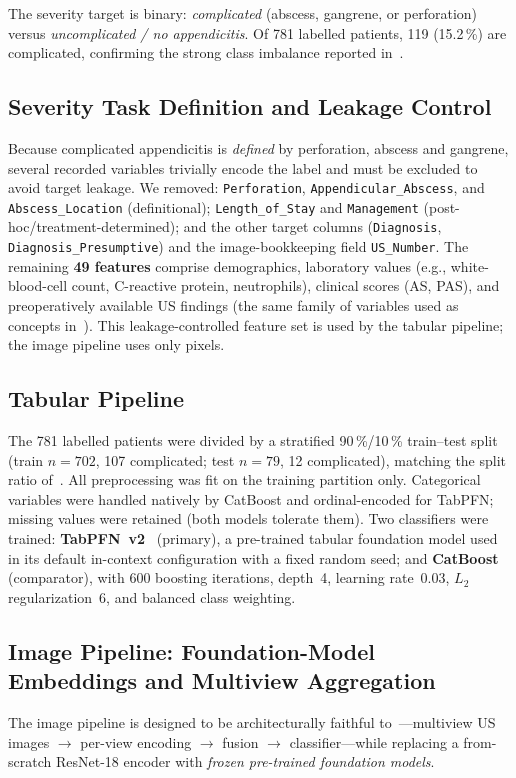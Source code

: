\documentclass[journal]{IEEEtran}
\begin{document}
The severity target is binary: \emph{complicated} (abscess, gangrene, or perforation)
versus \emph{uncomplicated / no appendicitis}. Of 781 labelled patients, 119
(15.2\,\%) are complicated, confirming the strong class imbalance reported
in~\cite{marcinkevics2024interpretable}.

\subsection{Severity Task Definition and Leakage Control}
Because complicated appendicitis is \emph{defined} by perforation, abscess and
gangrene, several recorded variables trivially encode the label and must be excluded to
avoid target leakage. We removed: \texttt{Perforation}, \texttt{Appendicular\_Abscess},
and \texttt{Abscess\_Location} (definitional); \texttt{Length\_of\_Stay} and
\texttt{Management} (post-hoc/treatment-determined); and the other target columns
(\texttt{Diagnosis}, \texttt{Diagnosis\_Presumptive}) and the image-bookkeeping field
\texttt{US\_Number}. The remaining \textbf{49 features} comprise demographics,
laboratory values (e.g., white-blood-cell count, C-reactive protein, neutrophils),
clinical scores (AS, PAS), and preoperatively available US findings (the same family of
variables used as concepts in~\cite{marcinkevics2024interpretable}). This
leakage-controlled feature set is used by the tabular pipeline; the image pipeline uses
only pixels.

\subsection{Tabular Pipeline}
The 781 labelled patients were divided by a stratified 90\,\%/10\,\% train--test split
(train $n=702$, 107 complicated; test $n=79$, 12 complicated), matching the split ratio
of~\cite{marcinkevics2024interpretable}. All preprocessing was fit on the training
partition only. Categorical variables were handled natively by CatBoost and
ordinal-encoded for TabPFN; missing values were retained (both models tolerate them).
Two classifiers were trained: \textbf{TabPFN~v2}~\cite{hollmann2025accurate} (primary),
a pre-trained tabular foundation model used in its default in-context configuration with
a fixed random seed; and \textbf{CatBoost}~\cite{prokhorenkova2018catboost}
(comparator), with 600 boosting iterations, depth~4, learning rate~0.03, $L_2$
regularization~6, and balanced class weighting.

\subsection{Image Pipeline: Foundation-Model Embeddings and Multiview Aggregation}
The image pipeline is designed to be architecturally faithful
to~\cite{marcinkevics2024interpretable}---multiview US images $\rightarrow$ per-view
encoding $\rightarrow$ fusion $\rightarrow$ classifier---while replacing a from-scratch
ResNet-18 encoder with \emph{frozen pre-trained foundation models}.
\end{document}
